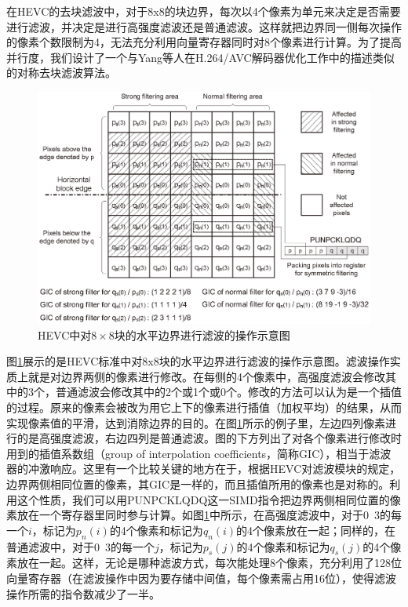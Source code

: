 在HEVC的去块滤波中，对于8x8的块边界，每次以4个像素为单元来决定是否需要进行滤波，并决定是进行高强度滤波还是普通滤波。这样就把边界同一侧每次操作的像素个数限制为4，无法充分利用向量寄存器同时对8个像素进行计算。为了提高并行度，我们设计了一个与Yang等人在H.264/AVC解码器优化工作\supercite{Yang-TCE2006}中的描述类似的对称去块滤波算法。

\begin{figure}[h]
	\centering
	\includegraphics[width = 1.0\linewidth]{eps/vertical_DF_to_horizontal_edge}
	\caption{\label{fig:vertical_DF_to_horizontal_edge}HEVC中对$8 \times 8$块的水平边界进行滤波的操作示意图}
\end{figure}

图\ref{fig:vertical_DF_to_horizontal_edge}展示的是HEVC标准中对8x8块的水平边界进行滤波的操作示意图。滤波操作实质上就是对边界两侧的像素进行修改。在每侧的4个像素中，高强度滤波会修改其中的3个，普通滤波会修改其中的2个或1个或0个。修改的方法可以认为是一个插值的过程。原来的像素会被改为用它上下的像素进行插值（加权平均）的结果，从而实现像素值的平滑，达到消除边界的目的。在图\ref{fig:vertical_DF_to_horizontal_edge}所示的例子里，左边四列像素进行的是高强度滤波，右边四列是普通滤波。图的下方列出了对各个像素进行修改时用到的插值系数组（group of interpolation coefficients，简称GIC），相当于滤波器的冲激响应\supercite{Norkin-TCSVT2012}。这里有一个比较关键的地方在于，根据HEVC对滤波模块的规定，边界两侧相同位置的像素，其GIC是一样的，而且插值所用的像素也是对称的。利用这个性质，我们可以用PUNPCKLQDQ这一SIMD指令把边界两侧相同位置的像素放在一个寄存器里同时参与计算。如图\ref{fig:vertical_DF_to_horizontal_edge}中所示，在高强度滤波中，对于0~3的每一个$i$，标记为$p_n(i)$的4个像素和标记为$q_n(i)$的4个像素放在一起；同样的，在普通滤波中，对于0~3的每一个$j$，标记为$p_s(j)$的4个像素和标记为$q_s(j)$的4个像素放在一起。这样，无论是哪种滤波方式，每次能处理8个像素，充分利用了128位向量寄存器（在滤波操作中因为要存储中间值，每个像素需占用16位），使得滤波操作所需的指令数减少了一半。

